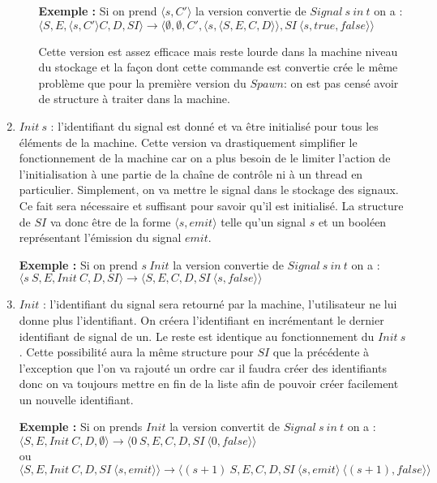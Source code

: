 \documentclass[10pt,a4paper]{report}
\begin{document}
\begin{enumerate}
\begin{enumerate}
    \textbf{Exemple :} Si on prend $\langle s,C'\rangle$ la version convertie de $Signal~s~in~t$ on a : 
    \\$\langle S,E,\langle s,C'\rangle C,D,SI\rangle \longrightarrow \langle \emptyset,\emptyset,C',\langle s,\langle S,E,C,D\rangle\rangle,SI~\langle s,true,false\rangle \rangle$ 
    \medbreak
    
    Cette version est assez efficace mais reste lourde dans la machine niveau du stockage et la façon dont cette commande est convertie crée le même problème que pour la première version du $Spawn$:  on est pas censé avoir de structure à traiter dans la machine.
  \end{enumerate}
  
\item $Init~s$ : l'identifiant du signal est donné et va être initialisé pour tous les éléments de la machine. Cette version va drastiquement simplifier le fonctionnement de la machine car on a plus besoin de le limiter l'action de l'initialisation à une partie de la chaîne de contrôle ni à un thread en particulier. Simplement, on va mettre le signal dans le stockage des signaux. Ce fait sera nécessaire et suffisant pour savoir qu'il est initialisé. La structure de $SI$ va donc être de la forme $\langle s,emit\rangle$ telle qu'un signal $s$ et un booléen représentant l'émission du signal $emit$.
  \medbreak
  
  \textbf{Exemple :} Si on prend $s~Init$ la version convertie de $Signal~s~in~t$ on a : 
  \\$\langle s~S,E,Init~C,D,SI\rangle \longrightarrow \langle S,E,C,D,SI~\langle s,false\rangle \rangle$ 
  \medbreak
  
\item $Init$ : l'identifiant du signal sera retourné par la machine, l'utilisateur ne lui donne plus l'identifiant. On créera l'identifiant en incrémentant le dernier identifiant de signal de un. Le reste est identique au fonctionnement du $Init~s$. Cette possibilité aura la même structure pour $SI$ que la précédente à l'exception que l'on va rajouté un ordre car il faudra créer des identifiants donc on va toujours mettre en fin de la liste afin de pouvoir créer facilement un nouvelle identifiant.
  \medbreak
  
  \textbf{Exemple :} Si on prends $Init$ la version convertit de $Signal~s~in~t$ on a : 
  \\$\langle S,E,Init~C,D,\emptyset\rangle \longrightarrow \langle 0~S,E,C,D,SI~\langle 0,false\rangle \rangle$ 
  \\ou
  \\$\langle S,E,Init~C,D,SI~\langle s,emit\rangle\rangle \longrightarrow \langle (s+1)~S,E,C,D,SI~\langle s,emit\rangle~\langle (s+1),false\rangle \rangle$ 
  \medbreak
\end{enumerate}
\bigbreak
\end{document}
